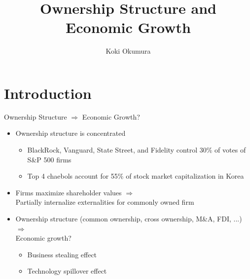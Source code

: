 \documentclass[
  10pt,
  aspectratio=169,   %
  handout           %
]{beamer}
\title{Ownership Structure and Economic Growth}
\author{Koki Okumura}
\institute{UCLA}
\date{}
\theoremstyle{plain}
\begin{document}
\begin{frame}
  \titlepage
\end{frame}

\section{Introduction}

\begin{frame}{Ownership Structure $\Longrightarrow$ Economic Growth?}
  \label{intro} %
  \begin{itemize}
    \item Ownership structure is concentrated \hfill \hyperlink{share}{}
    \begin{itemize}
      \item BlackRock, Vanguard, State Street, and Fidelity control 30\% of votes of S\&P 500 firms
      \item Top 4 chaebols account for 55\% of stock market capitalization in Korea
    \end{itemize}
    \medskip{} \pause
    \item Firms maximize shareholder values $\Longrightarrow$ \\
          Partially internalize externalities for commonly owned firm
    \medskip{} \pause
    \item Ownership structure (common ownership, cross ownership, M\&A, FDI, ...) $\Longrightarrow$ \\
          Economic growth?
    \begin{itemize}
      \item Business stealing effect
      \item Technology spillover effect
    \end{itemize}
  \end{itemize}
\end{frame}
\end{document}
